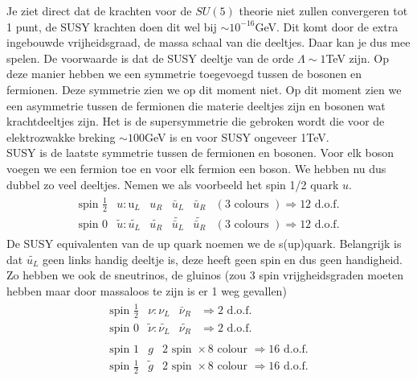 \documentclass[../main.tex]{subfiles}
\begin{document}
Je ziet direct dat de krachten voor de $SU(5)$ theorie niet zullen convergeren tot 1 punt, de SUSY krachten doen dit wel bij $\sim 10^{-16}$GeV. Dit komt door de extra ingebouwde vrijheidsgraad, de massa schaal van die deeltjes. Daar kan je dus mee spelen. De voorwaarde is dat de SUSY deeltje van de orde $\Lambda \sim 1$TeV zijn. Op deze manier hebben we een symmetrie toegevoegd tussen de bosonen en fermionen. Deze symmetrie zien we op dit moment niet. Op dit moment zien we een asymmetrie tussen de fermionen die materie deeltjes zijn en bosonen wat krachtdeeltjes zijn. Het is de supersymmetrie die gebroken wordt die voor de elektrozwakke breking $\sim 100$GeV is en voor SUSY ongeveer 1TeV.\\
SUSY is de laatste symmetrie tussen de fermionen en bosonen. Voor elk boson voegen we een fermion toe en voor elk fermion een boson. We hebben nu dus dubbel zo veel deeltjes. Nemen we als voorbeeld het spin 1/2 quark $u$.
\begin{equation}
    \begin{aligned}
        \label{eq:susy_deeltjes_1}
        \begin{array}{llllll}
            \text{ spin } \frac{1}{2} & u: \text{u}_{L} & u_{R} & \bar{u}_{L} & \bar{u}_{R} & (3 \text { colours }) \Rightarrow 12 \text { d.o.f. } \\
            \text { spin } 0 & \tilde{u}: \widetilde{u_{L}} & \widetilde{u_{R}} & \widetilde{\bar{u}_{L}} & \widetilde{\bar{u}_{R}} & (3 \text { colours }) \Rightarrow 12 \text { d.o.f. }
        \end{array}
    \end{aligned}
\end{equation}
De SUSY equivalenten van de up quark noemen we de s(up)quark. Belangrijk is dat $\widetilde{u_{L}}$ geen links handig deeltje is, deze heeft geen spin en dus geen handigheid. Zo hebben we ook de sneutrinos, de gluinos (zou 3 spin vrijgheidsgraden moeten hebben maar door massaloos te zijn is er 1 weg gevallen)
\begin{equation}
    \begin{aligned}
        \label{eq:susy_deeltjes_2}
        \begin{array}{llll}
            \text{ spin } \frac{1}{2} & \nu: \nu_{L} & \bar{\nu}_{R} & \Rightarrow 2 \text { d.o.f. } \\
            \text{ spin } 0 & \tilde{\nu}: \widetilde{\nu_{L}} & \widetilde{\nu_{R}} & \Rightarrow 2 \text { d.o.f. }
        \end{array}\\
        \begin{array}{lll}
            \text { spin } 1 & g & 2 \text{ spin } \times 8 \text { colour } \Rightarrow 16 \text { d.o.f. } \\
            \text{ spin } \frac{1}{2} & \tilde{g} & 2 \text{ spin } \times 8 \text { colour } \Rightarrow 16 \text { d.o.f. }
        \end{array}
    \end{aligned}
\end{equation}
\end{document}
